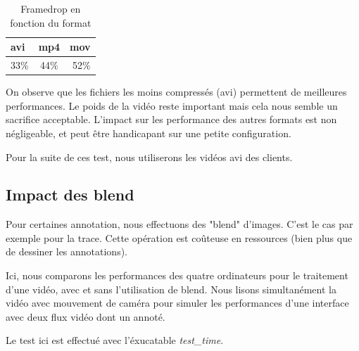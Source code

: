 \begin{table}[H]
\centering
\caption{Framedrop en fonction du format} 
\bigskip
\begin{tabular}{| l | c | r | }
     \hline
     avi & mp4 & mov \\ \hline
     33\% & 44\% & 52\% \\ \hline
\end{tabular}
\end{table}

On observe que les fichiers les moins compressés (avi) permettent
de meilleures performances. Le poids de la vidéo reste important
mais cela nous semble un sacrifice acceptable. 
L'impact sur les performance des autres formats est non
négligeable, et peut être handicapant sur une petite
configuration. 
\bigskip

Pour la suite de ces test, nous utiliserons les vidéos avi des
clients.

\subsection{Impact des blend}

Pour certaines annotation, nous effectuons des "blend" d'images.
C'est le cas par exemple pour la trace. Cette opération est
coûteuse en ressources (bien plus que de dessiner les
annotations). 
\bigskip

Ici, nous comparons les performances des quatre ordinateurs pour
le traitement d'une vidéo, avec et sans l'utilisation de blend.
Nous lisons simultanément la vidéo avec mouvement de caméra pour
simuler les performances d'une interface avec deux flux vidéo
dont un annoté. 
\bigskip

Le test ici est effectué avec l'éxucatable \textit{test\_time}.



